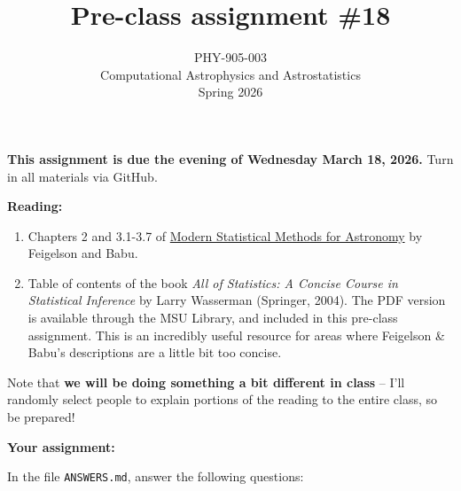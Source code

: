 \documentclass[10pt]{article}
\title{Pre-class assignment \#18}
\author{PHY-905-003\\Computational Astrophysics and
  Astrostatistics\\Spring 2026}
\date{} %
\begin{document}
 
\maketitle

\vspace{-10mm}

\noindent
\textbf{This assignment is due the evening of Wednesday March 18, 2026.}
 Turn in all materials via GitHub.

\vspace{5mm}

\noindent
\textbf{Reading:}

\begin{enumerate}

\item Chapters 2 and 3.1-3.7 of
  \href{http://astrostatistics.psu.edu/MSMA/}{Modern  Statistical
    Methods for Astronomy} by Feigelson and Babu.

\item Table of contents of the book \textit{All of Statistics: A
    Concise Course in Statistical Inference} by Larry Wasserman
  (Springer, 2004).  The PDF version is available through the MSU
  Library, and included in this pre-class assignment.  This is an
  incredibly useful resource for areas where Feigelson \& Babu's
  descriptions are a little bit too concise.  

\end{enumerate}

\noindent
Note that \textbf{we will be doing something a bit different in class}
-- I'll randomly select people to explain portions of the
reading to the entire class, so be prepared!

\vspace{5mm}

\noindent
\textbf{Your assignment:}  

\vspace{5mm}

\noindent
In the file \texttt{ANSWERS.md}, answer the following questions:
\end{document}
